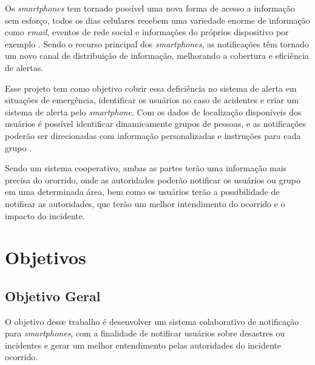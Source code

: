 \documentclass[	12pt, Times, openright, twoside, a4paper, english, brazil]{abntex2}
\begin{document}
Os \textit{smartphones} tem tornado possível uma nova forma de acesso a informação sem esforço, todos os dias celulares recebem uma variedade enorme de informação como \textit{email}, eventos de rede social e informações do próprios dispositivo por exemplo \cite{Mehrotra:2016:MPM:2858036.2858566}. Sendo o recurso principal dos \textit{smartphones}, as notificações têm tornado um novo canal de distribuição de informação, melhorando a cobertura e eficiência de alertas. 

Esse projeto tem como objetivo cobrir essa deficiência no sistema de alerta em situações de emergência, identificar os usuários no caso de acidentes e criar um sistema de alerta pelo \textit{smartphone}. Com os dados de localização disponíveis dos usuários é possível identificar dinamicamente grupos de pessoas, e as notificações poderão ser direcionadas com informação personalizadas e instruções para cada grupo \cite{Mehta:2013:CSD:2534303.2534307}.

Sendo um sistema cooperativo, ambas as partes terão uma informação mais precisa do ocorrido, onde as autoridades poderão notificar os usuários ou grupo em uma determinada área, bem como os usuários terão a possibilidade de notificar as autoridades, que terão um melhor intendimento do ocorrido e o impacto do incidente.


\section{Objetivos}

\subsection{Objetivo Geral}

O objetivo desse trabalho é desenvolver um sistema colaborativo de notificação para \textit{smartphones}, com a finalidade de notificar usuários sobre desastres ou incidentes e gerar um melhor entendimento pelas autoridades do incidente ocorrido.
\end{document}
